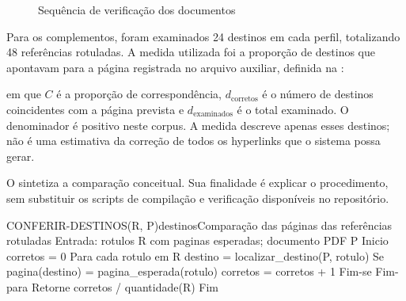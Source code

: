 \begin{figure}[htb]
  \centering
  \caption{Sequência de verificação dos documentos}
  \label{fig:verificacao}
\end{figure}

Para os complementos, foram examinados 24 destinos em cada perfil, totalizando
48 referências rotuladas. A medida utilizada foi a proporção de destinos
que apontavam para a página registrada no arquivo auxiliar, definida na
:


\noindent em que $C$ é a proporção de correspondência, $d_{\mathrm{corretos}}$
é o número de destinos coincidentes com a página prevista e
$d_{\mathrm{examinados}}$ é o total examinado. O denominador é positivo neste
corpus. A medida descreve apenas esses destinos; não é uma estimativa da
correção de todos os hyperlinks que o sistema possa gerar.

O  sintetiza a comparação conceitual. Sua finalidade
é explicar o procedimento, sem substituir os scripts de compilação e
verificação disponíveis no repositório.

\begin{undfpseudocodigo}{CONFERIR-DESTINOS(R, P)}{destinos}{Comparação das páginas das referências rotuladas}
Entrada: rotulos R com paginas esperadas; documento PDF P
Inicio
  corretos = 0
  Para cada rotulo em R
    destino = localizar_destino(P, rotulo)
    Se pagina(destino) = pagina_esperada(rotulo)
      corretos = corretos + 1
    Fim-se
  Fim-para
  Retorne corretos / quantidade(R)
Fim
\end{undfpseudocodigo}

